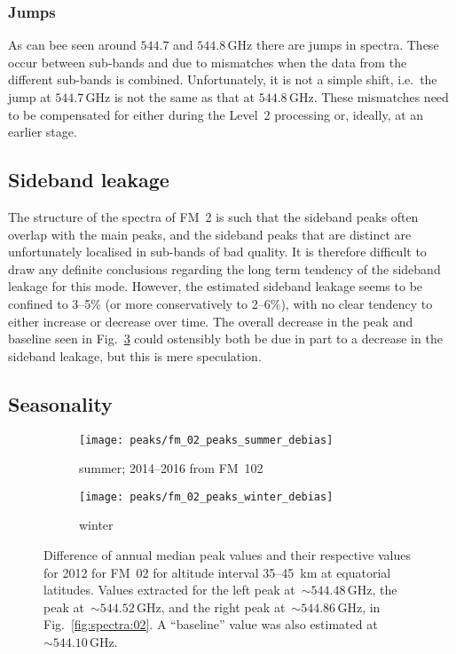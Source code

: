\subsubsection{Jumps}
\label{FM02:jumps}
As can bee seen around $544.7$ and $544.8\,\mathrm{GHz}$ there are jumps in
spectra.  These occur between sub-bands and due to mismatches when the data
from the different sub-bands is combined.  Unfortunately, it is not a simple
shift, i.e.\ the jump at $544.7\,\mathrm{GHz}$ is not the same as that at
$544.8\,\mathrm{GHz}$.  These mismatches need to be compensated for either
during the Level~2 processing or, ideally, at an earlier stage.


\subsection{Sideband leakage}
\label{FM02:sbl}
The structure of the spectra of FM~2 is such that the sideband peaks often
overlap with the main peaks, and the sideband peaks that are distinct are
unfortunately localised in sub-bands of bad quality.  It is therefore difficult
to draw any definite conclusions regarding the long term tendency of the
sideband leakage for this mode.  However, the estimated sideband leakage seems
to be confined to 3--5\% (or more conservatively to 2--6\%), with no clear
tendency to either increase or decrease over time.  The overall decrease in the
 peak and baseline seen in Fig.~\ref{fig:peaks:02} could
ostensibly both be due in part to a decrease in the sideband leakage, but this
is mere speculation.


\subsection{Seasonality}
\label{FM02:seasonality}

\begin{figure}[ht]
    \centering
    \begin{subfigure}[b]{0.9545\textwidth}
        \texttt{[image: peaks/fm\_02\_peaks\_summer\_debias]}
        \caption{summer; 2014--2016 from FM~102}\label{fig:peaks:02:summer}
    \end{subfigure}
    \begin{subfigure}[b]{0.9545\textwidth}
        \texttt{[image: peaks/fm\_02\_peaks\_winter\_debias]}
        \caption{winter}\label{fig:peaks:02:winter}
    \end{subfigure}
    \caption{Difference of annual median peak values and their respective
        values for 2012 for FM~02 for altitude interval 35--45~km at
        equatorial latitudes. Values extracted for the left  peak
        at~$\sim544.48\,\mathrm{GHz}$, the  peak
        at~$\sim544.52\,\mathrm{GHz}$, and the right  peak
        at~$\sim544.86\,\mathrm{GHz}$, in Fig.~\ref{fig:spectra:02}.  A
        ``baseline'' value was also estimated
        at~$\sim544.10\,\mathrm{GHz}$.
        }\label{fig:peaks:02}
\end{figure}

